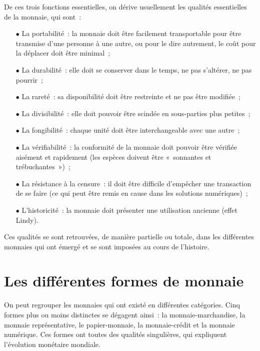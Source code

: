 De ces trois fonctions essentielles, on dérive usuellement les qualités essentielles de la monnaie, qui sont~: 

\begin{itemize}
\item[$\bullet$] La portabilité~: la monnaie doit être facilement transportable pour être transmise d'une personne à une autre, ou pour le dire autrement, le coût pour la déplacer doit être minimal~;
\item[$\bullet$] La durabilité~: elle doit se conserver dans le temps, ne pas s'altérer, ne pas pourrir~;
\item[$\bullet$] La rareté~: sa disponibilité doit être restreinte et ne pas être modifiée~;
\item[$\bullet$] La divisibilité~: elle doit pouvoir être scindée en sous-parties plus petites~;
\item[$\bullet$] La fongibilité~: chaque unité doit être interchangeable avec une autre~;
\item[$\bullet$] La vérifiabilité~: la conformité de la monnaie doit pouvoir être vérifiée aisément et rapidement (les espèces doivent être «~sonnantes et trébuchantes~»)~;
\item[$\bullet$] La résistance à la censure~: il doit être difficile d'empêcher une transaction de se faire (ce qui peut être remis en cause dans les solutions numériques)~;
\item[$\bullet$] L'historicité~: la monnaie doit présenter une utilisation ancienne (effet Lindy).
\end{itemize}

Ces qualités se sont retrouvées, de manière partielle ou totale, dans les différentes monnaies qui ont émergé et se sont imposées au cours de l'histoire.

\section*{Les différentes formes de monnaie}

On peut regrouper les monnaies qui ont existé en différentes catégories. Cinq formes plus ou moins distinctes se dégagent ainsi~: la monnaie-marchandise, la monnaie représentative, le papier-monnaie, la monnaie-crédit et la monnaie numérique. Ces formes ont toutes des qualités singulières, qui expliquent l'évolution monétaire mondiale. 


